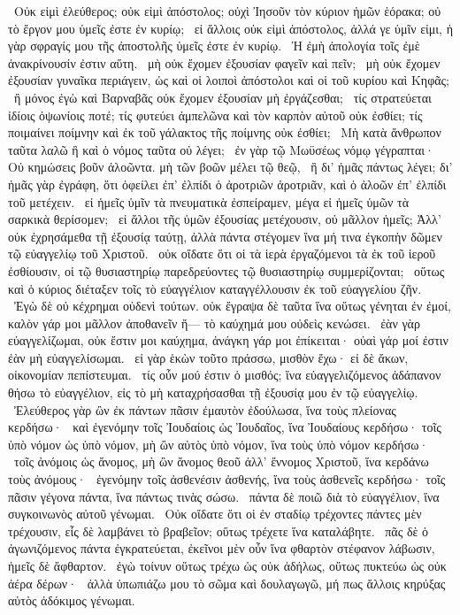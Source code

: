 ~Οὐκ εἰμὶ ἐλεύθερος; οὐκ εἰμὶ ἀπόστολος; οὐχὶ Ἰησοῦν τὸν κύριον ἡμῶν ἑόρακα; οὐ τὸ ἔργον μου ὑμεῖς ἐστε ἐν κυρίῳ;
~εἰ ἄλλοις οὐκ εἰμὶ ἀπόστολος, ἀλλά γε ὑμῖν εἰμι, ἡ γὰρ σφραγίς μου τῆς ἀποστολῆς ὑμεῖς ἐστε ἐν κυρίῳ.
~Ἡ ἐμὴ ἀπολογία τοῖς ἐμὲ ἀνακρίνουσίν ἐστιν αὕτη.
~μὴ οὐκ ἔχομεν ἐξουσίαν φαγεῖν καὶ πεῖν;
~μὴ οὐκ ἔχομεν ἐξουσίαν  γυναῖκα περιάγειν, ὡς καὶ οἱ λοιποὶ ἀπόστολοι καὶ οἱ  τοῦ κυρίου καὶ Κηφᾶς;
~ἢ μόνος ἐγὼ καὶ Βαρναβᾶς οὐκ ἔχομεν ἐξουσίαν μὴ ἐργάζεσθαι;
~τίς στρατεύεται ἰδίοις ὀψωνίοις ποτέ; τίς φυτεύει ἀμπελῶνα καὶ τὸν καρπὸν αὐτοῦ οὐκ ἐσθίει; τίς ποιμαίνει ποίμνην καὶ ἐκ τοῦ γάλακτος τῆς ποίμνης οὐκ ἐσθίει;
~Μὴ κατὰ ἄνθρωπον ταῦτα λαλῶ ἢ καὶ ὁ νόμος ταῦτα οὐ λέγει;
~ἐν γὰρ τῷ Μωϋσέως νόμῳ γέγραπται· Οὐ κημώσεις βοῦν ἀλοῶντα. μὴ τῶν βοῶν μέλει τῷ θεῷ,
~ἢ δι’ ἡμᾶς πάντως λέγει; δι’ ἡμᾶς γὰρ ἐγράφη, ὅτι ὀφείλει ἐπ’ ἐλπίδι ὁ ἀροτριῶν ἀροτριᾶν, καὶ ὁ ἀλοῶν ἐπ’ ἐλπίδι τοῦ μετέχειν.
~εἰ ἡμεῖς ὑμῖν τὰ πνευματικὰ ἐσπείραμεν, μέγα εἰ ἡμεῖς ὑμῶν τὰ σαρκικὰ θερίσομεν;
~εἰ ἄλλοι τῆς ὑμῶν ἐξουσίας μετέχουσιν, οὐ μᾶλλον ἡμεῖς; Ἀλλ’ οὐκ ἐχρησάμεθα τῇ ἐξουσίᾳ ταύτῃ, ἀλλὰ πάντα στέγομεν ἵνα μή τινα ἐγκοπὴν δῶμεν τῷ εὐαγγελίῳ τοῦ Χριστοῦ.
~οὐκ οἴδατε ὅτι οἱ τὰ ἱερὰ ἐργαζόμενοι τὰ ἐκ τοῦ ἱεροῦ ἐσθίουσιν, οἱ τῷ θυσιαστηρίῳ παρεδρεύοντες τῷ θυσιαστηρίῳ συμμερίζονται;
~οὕτως καὶ ὁ κύριος διέταξεν τοῖς τὸ εὐαγγέλιον καταγγέλλουσιν ἐκ τοῦ εὐαγγελίου ζῆν.
~Ἐγὼ δὲ οὐ κέχρημαι οὐδενὶ τούτων. οὐκ ἔγραψα δὲ ταῦτα ἵνα οὕτως γένηται ἐν ἐμοί, καλὸν γάρ μοι μᾶλλον ἀποθανεῖν ἤ— τὸ καύχημά μου οὐδεὶς κενώσει.
~ἐὰν γὰρ εὐαγγελίζωμαι, οὐκ ἔστιν μοι καύχημα, ἀνάγκη γάρ μοι ἐπίκειται· οὐαὶ γάρ μοί ἐστιν ἐὰν μὴ εὐαγγελίσωμαι.
~εἰ γὰρ ἑκὼν τοῦτο πράσσω, μισθὸν ἔχω· εἰ δὲ ἄκων, οἰκονομίαν πεπίστευμαι.
~τίς οὖν μού ἐστιν ὁ μισθός; ἵνα εὐαγγελιζόμενος ἀδάπανον θήσω τὸ εὐαγγέλιον, εἰς τὸ μὴ καταχρήσασθαι τῇ ἐξουσίᾳ μου ἐν τῷ εὐαγγελίῳ.
~Ἐλεύθερος γὰρ ὢν ἐκ πάντων πᾶσιν ἐμαυτὸν ἐδούλωσα, ἵνα τοὺς πλείονας κερδήσω·
~καὶ ἐγενόμην τοῖς Ἰουδαίοις ὡς Ἰουδαῖος, ἵνα Ἰουδαίους κερδήσω· τοῖς ὑπὸ νόμον ὡς ὑπὸ νόμον, μὴ ὢν αὐτὸς ὑπὸ νόμον, ἵνα τοὺς ὑπὸ νόμον κερδήσω·
~τοῖς ἀνόμοις ὡς ἄνομος, μὴ ὢν ἄνομος θεοῦ ἀλλ’ ἔννομος Χριστοῦ, ἵνα κερδάνω τοὺς ἀνόμους·
~ἐγενόμην τοῖς ἀσθενέσιν ἀσθενής, ἵνα τοὺς ἀσθενεῖς κερδήσω· τοῖς πᾶσιν γέγονα πάντα, ἵνα πάντως τινὰς σώσω.
~πάντα δὲ ποιῶ διὰ τὸ εὐαγγέλιον, ἵνα συγκοινωνὸς αὐτοῦ γένωμαι.
~Οὐκ οἴδατε ὅτι οἱ ἐν σταδίῳ τρέχοντες πάντες μὲν τρέχουσιν, εἷς δὲ λαμβάνει τὸ βραβεῖον; οὕτως τρέχετε ἵνα καταλάβητε.
~πᾶς δὲ ὁ ἀγωνιζόμενος πάντα ἐγκρατεύεται, ἐκεῖνοι μὲν οὖν ἵνα φθαρτὸν στέφανον λάβωσιν, ἡμεῖς δὲ ἄφθαρτον.
~ἐγὼ τοίνυν οὕτως τρέχω ὡς οὐκ ἀδήλως, οὕτως πυκτεύω ὡς οὐκ ἀέρα δέρων·
~ἀλλὰ ὑπωπιάζω μου τὸ σῶμα καὶ δουλαγωγῶ, μή πως ἄλλοις κηρύξας αὐτὸς ἀδόκιμος γένωμαι.

